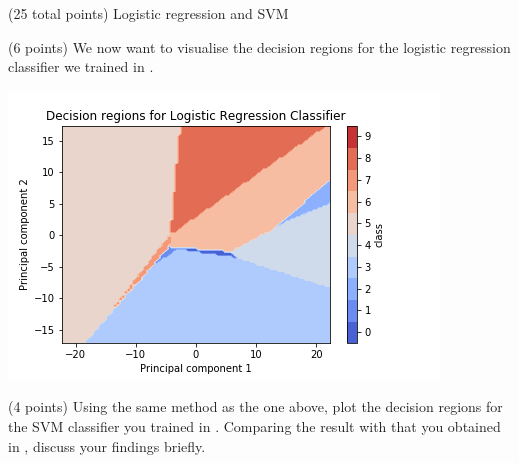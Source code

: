 \documentclass[12pt]{article}
\begin{document}
\begin{question}{(25 total points) Logistic regression and SVM}
\begin{subquestion}
   \end{subquestion}
   \begin{subquestion}{(6 points)
       We now want to visualise the decision regions for the logistic
       regression classifier we trained in .
     } \label{Q2.3}


   

      \begin{answerbox}{35em}
         \begin{center}
             \includegraphics[width=\textwidth]{results/2_3.png}
         \end{center}
      \end{answerbox}
  


   \end{subquestion}
   \begin{subquestion}{(4 points)
       Using the same method as the one above, plot the decision regions for
       the SVM classifier you trained in .
       Comparing the result with that you obtained in , discuss your
       findings briefly.
     } \label{Q2.4}
   


\end{subquestion}
\end{question}
\end{document}
